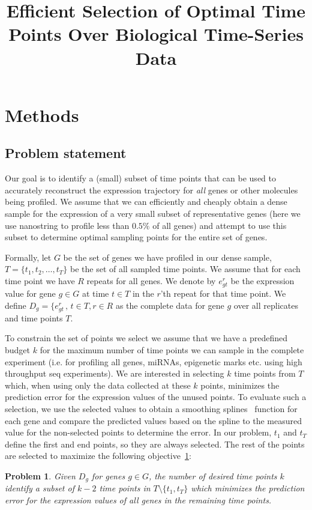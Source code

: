 \documentclass[10pt]{article}
\newtheorem{problem}{Problem}
\begin{document}
\title{Efficient Selection of Optimal Time Points Over Biological Time-Series Data}
\date{}

\maketitle

\section{Methods}

\subsection{Problem statement}
Our goal is to identify a (small) subset of time points that can be
used to accurately reconstruct the expression trajectory for {\em
all} genes or other molecules being profiled. We assume that we can
efficiently and cheaply obtain a dense sample for the expression of
a very small subset of representative genes (here we use nanostring
to profile less than $0.5\%$ of all genes) and attempt to use this
subset to determine optimal sampling points for the entire set of
genes.

Formally, let $G$ be the set of genes we have profiled in our dense
sample, $T = \{t_{1}, t_{2}, \ldots, t_{T}\}$ be the set of all
sampled time points. We assume that for each time point we have $R$
repeats for all genes. We denote by $e_{gt}^{r}$ be the expression
value for gene $g \in G$ at time $t \in T$ in the $r$'th repeat for
that time point. We define $D_{g} = \{e_{gt}^{r}\,,\, t \in T, r \in
R$ as the complete data for gene $g$ over all replicates and time
points $T$.

To constrain the set of points we select we assume that we have a
predefined budget $k$ for the maximum number of time points we can
sample in the complete experiment (i.e. for profiling all genes,
miRNAs, epigenetic marks etc. using high throughput seq
experiments). We are interested in selecting $k$ time points from
$T$ which, when using only the data collected at these $k$ points,
minimizes the prediction error for the expression values of the
unused points. To evaluate such a selection, we use the selected
values to obtain a smoothing splines~\cite{deboor, bar2003,
wahba1990} function for each gene and compare the predicted values
based on the spline to the measured value for the non-selected
points to determine the error. In our problem, $t_{1}$ and $t_{T}$
define the first and end points, so they are always selected. The
rest of the points are selected to maximize the following
objective~\ref{prob:prob1}:
%
\begin{problem}\label{prob:prob1}
Given $D_{g}$ for genes $g \in G$, the number of desired time points
$k$ identify a subset of $k-2$ time points in $T \setminus \{t_{1},
t_{T}\}$ which minimizes the prediction error for the expression
values of all genes in the remaining time points.
\end{problem}
\end{document}
